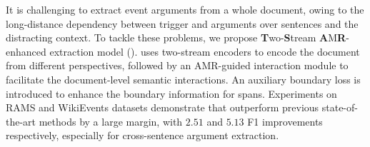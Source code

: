 It is challenging to extract event arguments from a whole document, owing to the long-distance dependency between trigger and arguments over sentences and the distracting context.
To tackle these problems, we propose \textbf{T}wo-\textbf{S}tream \textbf{A}M\textbf{R}-enhanced extraction model (\textbf{\modelname}).
\modelname uses two-stream encoders to encode the document from different perspectives, followed by an AMR-guided interaction module to facilitate the document-level semantic interactions.
An auxiliary boundary loss is introduced to enhance the boundary information for spans.
Experiments on RAMS and WikiEvents datasets demonstrate that \modelname outperform previous state-of-the-art methods by a large margin, with $2.51$ and $5.13$ F1 improvements respectively, especially for cross-sentence argument extraction.